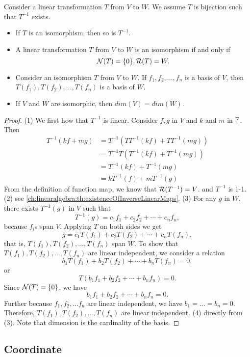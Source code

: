 \begin{refsection}
\begin{lemma}\label{ch:linearalgebra:th:BasicPropertiesOfIsomorphism}\hfill
Consider a linear transformation $T$ from $V$ to $W$. We assume $T$ is bijection such that $T^{-1}$ exists.
\begin{itemize}
	\item If $T$ is an isomorphism, then so is $T^{-1}$.
	\item A linear transformation $T$ from $V$ to $W$ is an isomorphism if and only if
	$$\mathcal{N}(T) = \{0\}, \mathcal{R}(T) = W.$$
	\item Consider an isomorphism $T$ from $V$ to $W$. If $f_1,f_2,...,f_n$ is a basis of $V$, then $T(f_1),T(f_2),...,T(f_n)$ is a basis of $W$.
	\item If $V$ and $W$ are isomorphic, then $dim(V) = dim(W)$. 
\end{itemize}	
\end{lemma}
\begin{proof}
(1) We first how that $T^{-1}$ is linear. Consider $f,g$ in $V$ and $k$ and $m$ in $\mathbb{F}$. Then
\begin{align*}
T^{-1}(kf + mg) &= T^{-1}(TT^{-1}(kf) + TT^{-1}(mg))\\
&=T^{-1}T(T^{-1}(kf) + T^{-1}(mg)) \\
&=T^{-1}(kf) + T^{-1}(mg)\\
&=kT^{-1}(f) + mT^{-1}(g)
\end{align*}	
From the definition of function map, we know that $\mathcal{R}(T^{-1}) = V$. and $T^{-1}$ is 1-1.
(2) see \autoref{ch:linearalgebra:th:existenceOfInverseLinearMaps}.
(3) For any $g$ in $W$, there exists $T^{-1}(g)$ in $V$ such that
$$T^{-1}(g) = c_1f_1 + c_2f_2 + \cdots +c_nf_n,$$
because $f_i$s span $V$. Applying $T$ on both sides we get 
$$g = c_1T(f_1) + c_2T(f_2) + \cdots + c_nT(f_n),$$
that is, $T(f_1),T(f_2),...,T(f_n)$ span $W$. 
To show that $T(f_1),T(f_2),...,T(f_n)$ are linear independent, we consider a relation
$$b_1T(f_1) + b_2T(f_2) + \cdots + b_nT(f_n) = 0,$$
or
$$T(b_1f_1 + b_2f_2 + \cdots + b_nf_n) = 0.$$
Since $\mathcal{N}(T) = \{0\}$, we have $$b_1f_1 + b_2f_2 + \cdots + b_nf_n = 0.$$
Further because $f_1,f_2,...f_n$ are linear independent, we have
$b_1=...=b_n = 0$. Therefore, $T(f_1),T(f_2),...,T(f_n)$ are linear independent.
(4) directly from (3). Note that dimension is the cardinality of the basis.
\end{proof}



\subsection{Coordinate}


\end{refsection}
